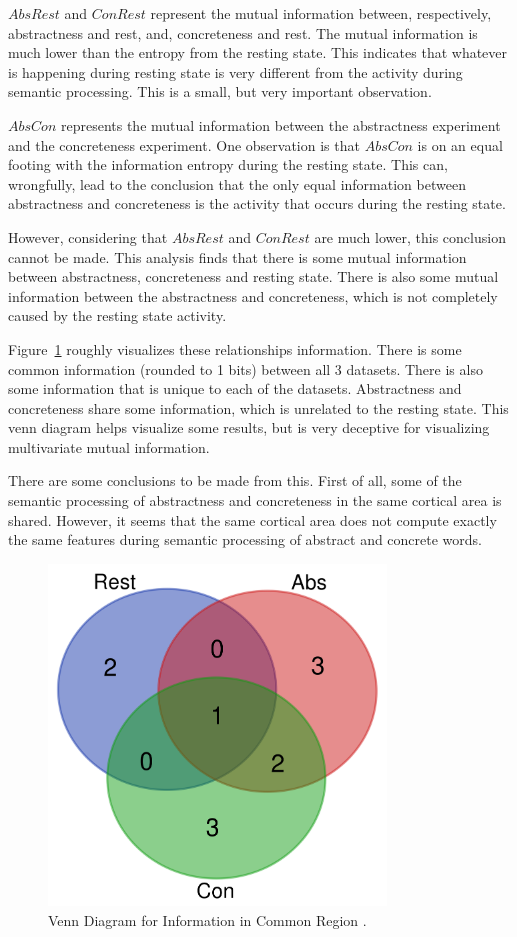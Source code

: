 $AbsRest$ and $ConRest$ represent the mutual information between, respectively, abstractness and rest, and, concreteness and rest. The mutual information is much lower than the entropy from the resting state. This indicates that whatever is happening during resting state is very different from the activity during semantic processing. This is a small, but very important observation.

$AbsCon$ represents the mutual information between the abstractness experiment and the concreteness experiment. One observation is that $AbsCon$ is on an equal footing with the information entropy during the resting state. This can, wrongfully, lead to the conclusion that the only equal information between abstractness and concreteness is the activity that occurs during the resting state.

However, considering that $AbsRest$ and $ConRest$ are much lower, this conclusion cannot be made. This analysis finds that there is some mutual information between abstractness, concreteness and resting state. There is also some mutual information between the abstractness and concreteness, which is not completely caused by the resting state activity. 

Figure~\ref{venn} roughly visualizes these relationships information. There is some common information (rounded to 1 bits) between all 3 datasets. There is also some information that is unique to each of the datasets. Abstractness and concreteness share some information, which is unrelated to the resting state. This venn diagram helps visualize some results, but is very deceptive for visualizing multivariate mutual information.

There are some conclusions to be made from this. First of all, some of the semantic processing of abstractness and concreteness in the same cortical area is shared. However, it seems that the same cortical area does not compute exactly the same features during semantic processing of abstract and concrete words. 

\begin{figure}[!htb]
\caption{Venn Diagram for Information in Common Region \cite{venn}.}
\label{venn}
    \centering
    \includegraphics[width=0.8\textwidth]{fig/venn}
\end{figure}

